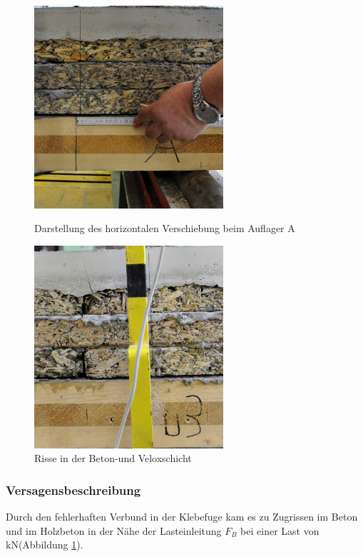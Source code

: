 \begin{figure}[h]
\begin{minipage}[hbt]{7cm}	
	\includegraphics[width=7cm]{Auswertung/4versuch/4versuch_versagen.jpg}
	\caption{Darstellung des horizontalen Verschiebung beim Auflager A}
	\label{4versuch_versagen}
\end{minipage}
\hfill
\begin{minipage}[hbt]{7cm}
	\includegraphics[width=7cm]{Auswertung/4versuch/4versuch_schichtbruch.jpg}
	\caption{Risse in der Beton-und Veloxschicht}
	\label{4versuch_schichtbruch}
\end{minipage}
\end{figure}



\subsubsection{Versagensbeschreibung}

Durch den fehlerhaften Verbund in der Klebefuge kam es zu Zugrissen im Beton und im Holzbeton in der Nähe der Lasteinleitung $F_B$ bei einer Last von \unit[5]{kN}(Abbildung \ref{4versuch_schichtbruch}). 


